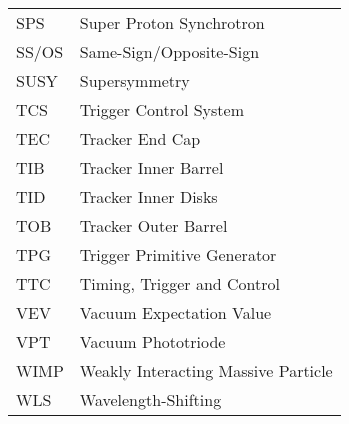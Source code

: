 \begin{longtable}[l]{@{}l@{\ \ \ \ \ \ \ \ \ \ \ \ }l}
SPS        & Super Proton Synchrotron \\
SS/OS      & Same-Sign/Opposite-Sign \\
SUSY       & Supersymmetry \\
TCS        & Trigger Control System \\
TEC        & Tracker End Cap \\
TIB        & Tracker Inner Barrel \\
TID        & Tracker Inner Disks \\
TOB        & Tracker Outer Barrel \\
TPG        & Trigger Primitive Generator \\
TTC        & Timing, Trigger and Control \\
VEV        & Vacuum Expectation Value \\
VPT        & Vacuum Phototriode \\
WIMP       & Weakly Interacting Massive Particle \\
WLS        & Wavelength-Shifting \\
\end{longtable}